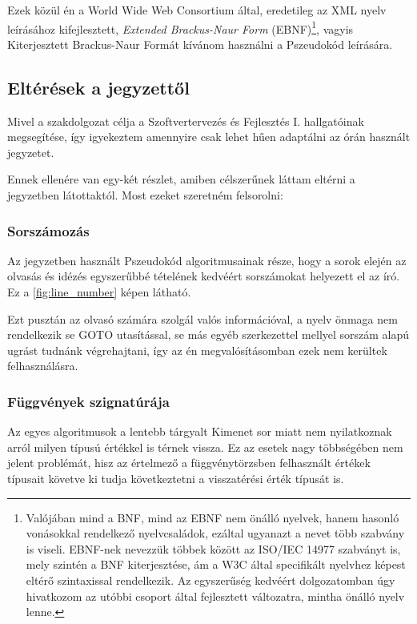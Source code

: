 Ezek közül én a World Wide Web Consortium által, eredetileg az XML nyelv leírásához kifejlesztett\cite{w3c}, \textit{Extended Brackus-Naur Form} (EBNF)\footnote{Valójában mind a BNF, mind az EBNF nem önálló nyelvek, hanem hasonló vonásokkal rendelkező nyelvcsaládok, ezáltal ugyanazt a nevet több szabvány is viseli. EBNF-nek nevezzük többek között az ISO/IEC 14977 szabványt is, mely szintén a BNF kiterjesztése, ám a W3C által specifikált nyelvhez képest eltérő szintaxissal rendelkezik. Az egyszerűség kedvéért dolgozatomban úgy hivatkozom az utóbbi csoport által fejlesztett változatra, mintha önálló nyelv lenne.}, vagyis Kiterjesztett Brackus-Naur Formát kívánom használni a Pszeudokód leírására.



\subsection{Eltérések a jegyzettől}

Mivel a szakdolgozat célja a Szoftvertervezés és Fejlesztés I. hallgatóinak megsegítése, így igyekeztem amennyire csak lehet hűen adaptálni az órán használt jegyzetet\cite{jegyzet}.

Ennek ellenére van egy-két részlet, amiben célszerűnek láttam eltérni a jegyzetben látottaktól. Most ezeket szeretném felsorolni:

\subsubsection{Sorszámozás}

Az jegyzetben használt Pszeudokód algoritmusainak része, hogy a sorok elején az olvasás és idézés egyszerűbbé tételének kedvéért sorszámokat helyezett el az író. Ez a \ref{fig:line_number} képen látható.


Ezt pusztán az olvasó számára szolgál valós információval, a nyelv önmaga nem rendelkezik se GOTO utasítással, se más egyéb szerkezettel mellyel sorszám alapú ugrást tudnánk végrehajtani, így az én megvalósításomban ezek nem kerültek felhasználásra.

\subsubsection{Függvények szignatúrája}

Az egyes algoritmusok a lentebb tárgyalt Kimenet sor miatt nem nyilatkoznak arról milyen típusú értékkel is térnek vissza. Ez az esetek nagy többségében nem jelent problémát, hisz az értelmező a függvénytörzsben felhasznált értékek típusait követve ki tudja következtetni a visszatérési érték típusát is.

